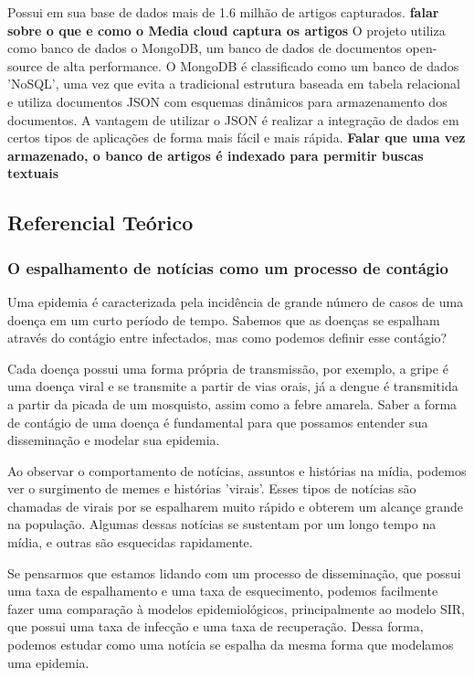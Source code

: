 \documentclass[a4paper,12pt]{article}
\begin{document}
 Possui em
sua base de dados mais de 1.6 milhão de artigos capturados.
\textbf{falar sobre o que e como o Media cloud captura os artigos}
O projeto utiliza como banco de dados o MongoDB, um banco de dados de documentos open-source de alta performance. O MongoDB é classificado como um banco de 
dados 'NoSQL', uma vez que evita a tradicional estrutura  baseada em tabela relacional e utiliza documentos JSON com esquemas dinâmicos para armazenamento 
dos documentos. A vantagem de utilizar o JSON é realizar a integração de dados em certos tipos de aplicações de forma mais fácil e mais rápida.
\textbf{Falar que uma vez armazenado, o banco de artigos é indexado para permitir buscas textuais}

\subsection{Referencial Teórico}


\subsubsection{O espalhamento de notícias como um processo de contágio}

Uma epidemia é caracterizada pela incidência de grande número de casos de uma doença em um curto período de tempo. Sabemos que as doenças
se espalham através do contágio entre infectados, mas como podemos definir esse contágio? 

Cada doença possui uma forma própria de transmissão, por exemplo, a gripe é uma doença viral e se transmite a partir de vias orais, já a dengue
é transmitida a partir da picada de um mosquisto, assim como a febre amarela. Saber a forma de contágio de uma doença é fundamental para que
possamos entender sua disseminação e modelar sua epidemia.

Ao observar o comportamento de notícias, assuntos e histórias na mídia, podemos ver o surgimento de memes e histórias 'virais'. Esses 
tipos de notícias são chamadas de virais por se espalharem muito rápido e obterem um alcançe grande na população. Algumas dessas notícias
se sustentam por um longo tempo na mídia, e outras são esquecidas rapidamente. 

Se pensarmos que estamos lidando com um processo de disseminação, que possui uma taxa de espalhamento e uma taxa de esquecimento, podemos
facilmente fazer uma comparação à modelos epidemiológicos, principalmente ao modelo SIR, que possui uma taxa de infecção e
uma taxa de recuperação. Dessa forma, podemos estudar como uma notícia se espalha da mesma forma que modelamos uma epidemia.
\end{document}
